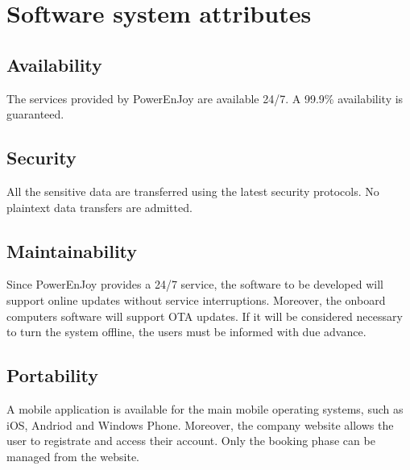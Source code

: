 \section{Software system attributes}

\subsection{Availability}
The services provided by PowerEnJoy are available 24/7. A 99.9\% availability is guaranteed.

\subsection{Security}
All the sensitive data are transferred using the latest security protocols. No plaintext data transfers are admitted.

\subsection{Maintainability}
Since PowerEnJoy provides a 24/7 service, the software to be developed will support online updates without service interruptions. Moreover, the onboard computers software will support OTA updates. If it will be considered necessary to turn the system offline, the users must be informed with due advance.

\subsection{Portability}
A mobile application is available for the main mobile operating systems, such as iOS, Andriod and Windows Phone. Moreover, the company website allows the user to registrate and access their account. Only the booking phase can be managed from the website.
